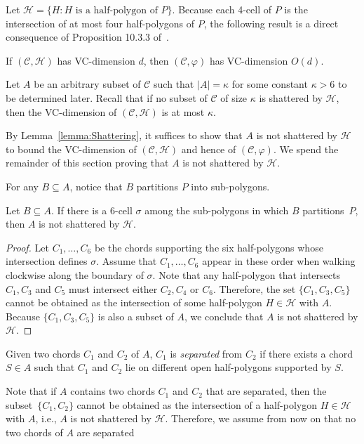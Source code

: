 \documentclass[a4paper,UKenglish]{lipics}
\newcommand{\tcell}{4-cell\xspace}
\begin{document}
Let $\mathcal H = \{H : H\text{ is a half-polygon of }P\}$.
Because each \tcell of $P$ is the intersection of at most four half-polygons of $P$,
the following result is a direct consequence of Proposition 10.3.3 of~\cite[Chapter 10]{matouvsek2002lectures}.

\begin{lemma}\label{lemma:Shattering}
If $(\mathcal C, \mathcal H)$ has VC-dimension $d$, then $(\mathcal C, \varphi)$ has VC-dimension $O(d)$.
\end{lemma}

Let $A$ be an arbitrary subset of $\mathcal C$ such that $|A| = \kappa$ for some constant $\kappa >6$ to be determined later.
Recall that if no subset of $\mathcal C$ of size $\kappa$ is shattered by $\mathcal H$, then the VC-dimension of $(\mathcal C, \mathcal H)$ is at most $\kappa$.

By Lemma~\ref{lemma:Shattering}, it suffices to show that $A$ is not shattered by $\mathcal H$ to bound the VC-dimension of $(\mathcal C, \mathcal H)$ and hence of $(\mathcal C, \varphi)$.
We spend the remainder of this section proving that $A$ is not shattered by $\mathcal H$.

For any $B\subseteq A$, notice that $B$ partitions $P$ into sub-polygons. 

\begin{lemma}\label{lemma:Hexagonal face}
Let $B\subseteq A$. 
If there is a $6$-cell $\sigma$ among the sub-polygons in which $B$ partitions~$P$,
then $A$ is not shattered by $\mathcal H$.
\end{lemma}
\begin{proof}
Let $C_1, \ldots, C_6$ be the chords supporting the six half-polygons whose intersection defines $\sigma$. Assume that $C_1, \ldots, C_6$ appear in these order when walking clockwise along the boundary of $\sigma$.
Note that any half-polygon that intersects $C_1, C_3$ and $C_5$ must intersect either $C_2, C_4$ or $C_6$. 
Therefore, the set $\{C_1, C_3, C_5\}$ cannot be obtained as the intersection of some half-polygon $H\in \mathcal H$ with $A$. 
Because $\{C_1, C_3, C_5\}$ is also a subset of $A$, 
we conclude that $A$ is not shattered by $\mathcal H$.
\end{proof}

Given two chords $C_1$ and $C_2$ of $A$, $C_1$ is \emph{separated} from $C_2$ if there exists a chord $S\in A$ such that $C_1$ and $C_2$ lie on different open half-polygons supported by $S$.

Note that if $A$ contains two chords $C_1$ and $C_2$ that are separated, then the subset~$\{C_1, C_2\}$ cannot be obtained as the intersection of a half-polygon $H\in \mathcal H$ with $A$, i.e., $A$ is not shattered by $\mathcal H$. 
Therefore, we assume from now on that no two chords of $A$ are separated
\end{document}
